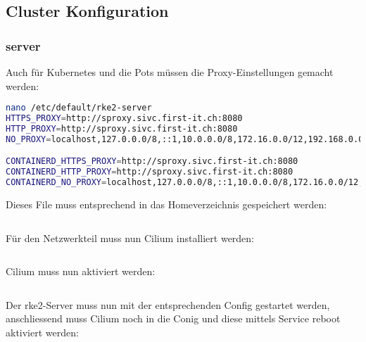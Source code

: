 \subsection{Cluster Konfiguration}
\subsubsection{server}
Auch für Kubernetes und die Pots müssen die Proxy-Einstellungen gemacht werden:
\lstset{style=gra_codestyle}
\begin{lstlisting}[language=bash, caption=rke2 server proxy,captionpos=b,label={lst:rke2-server-proxy},breaklines=true]
nano /etc/default/rke2-server
HTTPS_PROXY=http://sproxy.sivc.first-it.ch:8080
HTTP_PROXY=http://sproxy.sivc.first-it.ch:8080
NO_PROXY=localhost,127.0.0.0/8,::1,10.0.0.0/8,172.16.0.0/12,192.168.0.0/16

CONTAINERD_HTTPS_PROXY=http://sproxy.sivc.first-it.ch:8080
CONTAINERD_HTTP_PROXY=http://sproxy.sivc.first-it.ch:8080
CONTAINERD_NO_PROXY=localhost,127.0.0.0/8,::1,10.0.0.0/8,172.16.0.0/12,192.168.0.0/16
\end{lstlisting}

Dieses File muss entsprechend in das Homeverzeichnis gespeichert werden:
\lstset{style=gra_codestyle}
\begin{lstlisting}[language=bash, caption=rke2 server proxy kopieren,captionpos=b,label={lst:rke2-server-proxy-copy},breaklines=true]

\end{lstlisting}

Für den Netzwerkteil muss nun Cilium installiert werden:
\lstset{style=gra_codestyle}
\begin{lstlisting}[language=bash, caption=rke2 server cilium installieren,captionpos=b,label={lst:rke2-server-cilium-install},breaklines=true]

\end{lstlisting}

Cilium muss nun aktiviert werden:
\begin{lstlisting}[language=bash, caption=rke2 server cilium aktivieren,captionpos=b,label={lst:rke2-server-cilium-apply},breaklines=true]

\end{lstlisting}

Der rke2-Server muss nun mit der entsprechenden Config gestartet werden, anschliessend muss Cilium noch in die Conig und diese mittels Service reboot aktiviert werden:
\lstset{style=gra_codestyle}
\begin{lstlisting}[language=bash, caption=rke2 server starten,captionpos=b,label={lst:rke2-server-start},breaklines=true]

\end{lstlisting}


